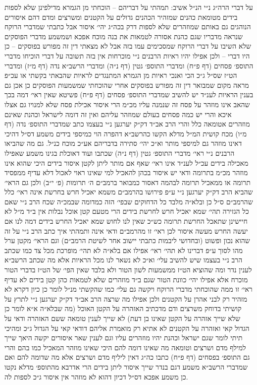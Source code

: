 \documentclass[12pt, openany]{book}
\begin{document}
\begin{multicols}{2}
על דברי הרה״ג נ״י הנ״ל אשיב: תמהתי על דבריהם – הוכחתי מן הגמרא מדילפינן שלא לספות בידים מטומאת כהנים שמזהיר הכהנים גדולים על הקטנים ומשרצים ומדם דהם איסורים הנוהגים גם באותם שמוזהרים שלא לספות דרק בכה״ג יהי׳ איסור אבל כתבתי שמדברי הרוקח שנראה מדבריו שגם כהנת אסורה לטמאות את בנה מוכח אפכא ושמשמע מדברי הפוסקים שלא השיבו על דברי הרוקח שמסכימים עמו בזה אבל לא מצאתי דין זה מפורש בפוסקים – כן היו דברי – ולכן אפילו יהיו ראיות הרבנים נ״י מוכרחות אין בזה תשובה על דברי הוכיחו מדברי התוספ׳ פסחים (דף פ״ח) ומדברי התוספ׳ גטין (דף נ״ה) ומדברי הרשב״א נדה (דף מ״ז) ומדברי הט״ז שס״ל ג״כ הכי ואנכי ראיות מן הגמרא המתנגדים לראיות שהבאתי בקשתי או עכ״פ מראה מקום שמבואר דין זה מפורש בפוסקים אחרי שהוכחתי שמשמעות הפוסקים כן אכן גם בענין הראיות לענ״ד יש להשיב שמדברי התוספ׳ פסחים (דף פ״ח) פשיטא שאין ראי׳ דמה בכך שהאב אינו מוזהר על פסח זה שנמנה עליו מכ״מ הרי איסור אכילת פסח שלא למנויו גם אצלו איכא והרי יש כמה פסחים בעולם שמוזהר עליהם ואין זה דומה לישראל וכהנת שאינם מוזהרים אטומאה כלל והרי הרב אב״ד דק״ק יערגען נ״י בעצמו כתב שמדברי התוספ׳ נדה (דף מ״ו) מכח קושית המ״ל מדלא הקשו כהרשב״א דהפרה הוי כמיספי בידים משמע דס״ל דהיכי דאינו מוזהר גם למיספי מותר וא״כ יהי׳ סתירה בדבריהם אע״כ מוכח כנ״ל. גם מה שהביאו הרבנים נ״י ראי׳ מדברי התוספ׳ גטין (דף נ״ה) שכתבו ועוד דאוכלת בגינו משמע שאפילו מאכילה בידים עכ״ל לענ״ד אינו ראי׳ שאף אם מותר ליתן לקטן איסור בידים היכי שהוא אינו מוזהר מכ״מ בתרומה ודאי יש איסור בכהן להאכיל למי שאינו ראוי לאכול דלא עדיף ממפסיד תרומה או ממאכיל תרומה לבהמה דאסור כמבואר ברמב״ם ה׳ תרומות (פ׳ י״ב) ולכן גם הראי׳ שהביא הרב דק״ק יערגען נ״י ע״פ פירושו בהרמב״ם משמא יאכיל חרש בחרשת אינה ראי׳ כלל שהרמב״ם ס״ל כן ובלא״ה מלבד כל הדחוקים שבפי׳ הזה כמדומה שבמכ״ה שכח הרב נ״י שאם כל הגזירה תהי׳ שמא יאכיל חרש לחרשת בידים הרי מטעם קטן אוכל נבלות אין ב״ד מ״ל לא חיישינן שתאכל החרשת תרומה כש״כ שאין לנו לחוש שמא יאכיל החרש בידים דמה לנו אם יעשה החרש מעשה איסור לכן ראי׳ זו מהרמב״ם ודאי אינה ותמהתי איך כתב הרב נ״י על זה שהוא נכון ופשוט (ובחדושי ליבמות כתבתי יישוב אחר לשיטת הרמב״ם) וגם הראי׳ מקטן ערל מהו לסוך ע״פ דברינו לא תהי׳ ראי׳ אפילו אם בלא״ה לא תהי׳ מופרכת מכל צד כמו שכתב הרב נ״י בעצמו שיש להשיב עלי׳ וא״כ לא נשאר לנו מכל הראיות אלא מה שכתב הרשב״א לענין נדר ומה שהוציא הט״ז ממשמעות לשון הטור ולא בלבד שאין הפי׳ של הט״ז בדברי הטור מוכרח אלא אפילו יהי׳ כוונת הטור שגם ב״ד מוזהרים שלא לטמאות כהן קטן בידים לא עדיף ראי׳ זו ממה שהוכחתי מדברי הרוקח ויקשה גם עלי׳ כמו שהקשתי מנ״ל לומר כן כיון דקרא לא מזהיר רק לבני אהרן על הקטנים ולכן אפילו מה שרצה הרב אב״ד דק״ק יערגען נ״י לתרץ על קושיתי בדוחק משרצים ודם מדכתיב האזהרה על הקטן האוכל (מה שבלא״ה א״א לומר כן שלא שייך אזהרה על הקטן שאינו בן דעת) לא שייך לענין טומאה ששם האזהרה ודאי על הגדול קאי ואזהרה על הקטנים לא אתיא רק מואמרת אליהם דודאי קאי על הגדול ג״כ ומהיכי תיתי לומר שגם ישראל וכהנת יהיו מוזהרים עליו וגם לענין שאר איסורים יקשה היאך שייך למילף מדם ושרצים וטומאה מה שאינו דומה להם היכי שאינו מוזהר המאכיל כמו בהם והרי גם התוספ׳ בפסחים (דף פ״ח) כתבו כה״ג דאין ליליף מדם ושרצים אלא מה שדומה להם ואם שמדברי הרשב״א משמע דגם בנדר שייך איסור ליתן בידים הרי אדרבא מהתוספ׳ מדלא נקטו כן משמע אפכא דס״ל דכיון דהוא לא מוזהר אין איסור ג״כ לספות לה.\\\vspace{0pt}


\end{multicols}
\end{document}
